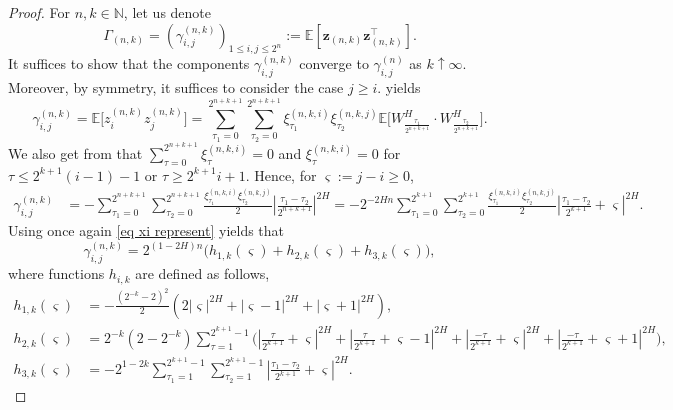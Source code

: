 \documentclass[12pt,reqno]{article}
\def\ua{\uparrow}
\numberwithin{equation}{section}
\theoremstyle{definition}
\def\ua{\uparrow}
\newcommand{\bE}{\mathbb{E}}
\newcommand{\bN}{\mathbb{N}}
\begin{document}
\begin{proof}
For $n,k \in \bN$, let us denote 
\begin{equation*}
	\Gamma_{(n,k)} = (\gamma^{(n,k)}_{i,j})_{1\le i,j \le 2^n} := \bE\left[ \bm{z}_{(n,k)}\bm{z}_{(n,k)}^\top\right].
\end{equation*}
It suffices to show that the components $\gamma^{(n,k)}_{i,j}$  converge to $\gamma^{(n)}_{i,j}$  as $k \ua \infty$. Moreover, by symmetry, it suffices to consider the case $j\ge i$.  yields
$$\gamma^{(n,k)}_{i,j} = \bE\big[z^{(n,k)}_{i}z^{(n,k)}_{j}\big]=\sum_{\tau_1 = 0}^{2^{n+k+1}}\sum_{\tau_2 = 0}^{2^{n+k+1}}\xi^{(n,k,i)}_{\tau_1}\xi^{(n,k,j)}_{\tau_2}\bE\Big[W^H_{\frac{\tau_1}{2^{n+k+1}}}\cdot W^H_{\frac{\tau_2}{2^{n+k+1}}}\Big].
$$
We also get from  that 
  $\sum_{\tau = 0}^{2^{n+k+1}}\xi_{\tau}^{(n,k,i)} = 0$ and $\xi_{\tau}^{(n,k,i)}   = 	0 $ for $ \tau \le 2^{k+1}(i-1)-1$ or $\tau \ge 2^{k+1}i+1$. Hence, for  $\varsigma := j-i \ge0$,
\begin{equation*}
\begin{split}
\gamma^{(n,k)}_{i,j}&=-\sum_{\tau_1 = 0}^{2^{n+k+1}}\sum_{\tau_2 = 0}^{2^{n+k+1}}\frac{\xi^{(n,k,i)}_{\tau_1}\xi^{(n,k,j)}_{\tau_2}}{2}\left|\frac{\tau_1-\tau_2}{2^{n+k+1}}\right|^{2H} =  -2^{-2Hn}\sum_{\tau_1 = 0}^{2^{k+1}}\sum_{\tau_2 =0}^{2^{k+1}}\frac{\xi^{(n,k,i)}_{\tau_1}\xi^{(n,k,j)}_{\tau_2}}{2}\left|\frac{\tau_1-\tau_2}{2^{k+1}} + \varsigma\right|^{2H}.
\end{split}
\end{equation*}
Using once again \eqref{eq xi represent} yields that 
\begin{equation}\label{eq expansion}
\gamma^{(n,k)}_{i,j} = 2^{(1-2H)n}\big(h_{1,k}(\varsigma)+h_{2,k}(\varsigma)+h_{3,k}(\varsigma)\big),
\end{equation}
where functions $h_{i,k}$ are defined as follows,
\begin{equation*}
\begin{split}
h_{1,k}(\varsigma) &= -\frac{(2^{-k}-2)^2}{2}\left(2|\varsigma|^{2H} + |\varsigma-1|^{2H}+|\varsigma+1|^{2H}\right),\\
h_{2,k}(\varsigma) &= 2^{-k}(2-2^{-k})\sum_{\tau = 1}^{2^{k+1}-1}\Big(\left|\frac{\tau}{2^{k+1}} + \varsigma\right|^{2H}+ \left|\frac{\tau}{2^{k+1}} + \varsigma-1\right|^{2H} + \left|\frac{-\tau}{2^{k+1}} + \varsigma\right|^{2H}+ \left|\frac{-\tau}{2^{k+1}} + \varsigma+1\right|^{2H}\Big),\\
h_{3,k}(\varsigma) &= -2^{1-2k}\sum_{\tau_1 = 1}^{2^{k+1}-1}\sum_{\tau_2 = 1}^{2^{k+1}-1}\left|\frac{\tau_1-\tau_2}{2^{k+1}} + \varsigma\right|^{2H}.

\end{split}
\end{equation*}
\end{proof}
\end{document}
